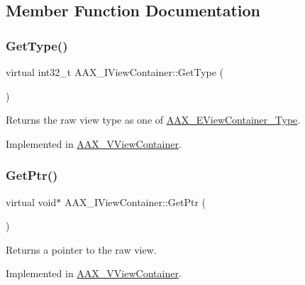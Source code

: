 \subsection{Member Function Documentation}
\mbox{\label{a01889_a1715c042ed8412a2135f4d9e5109e8fb}} 
\subsubsection{\texorpdfstring{GetType()}{GetType()}}
{\footnotesize\ttfamily virtual int32\+\_\+t A\+A\+X\+\_\+\+I\+View\+Container\+::\+Get\+Type (\begin{DoxyParamCaption}{ }\end{DoxyParamCaption})\hspace{0.3cm}{\ttfamily [pure virtual]}}



Returns the raw view type as one of \mbox{\hyperlink{a00503_ab4c36de253fc80b541eb51074c64caef}{A\+A\+X\+\_\+\+E\+View\+Container\+\_\+\+Type}}. 



Implemented in \mbox{\hyperlink{a01945_a2d1b4bc3d5ff813a4761fd0200073be7}{A\+A\+X\+\_\+\+V\+View\+Container}}.

\mbox{\label{a01889_adfde8f90c9a29b83dc80042cf9c3f749}} 
\subsubsection{\texorpdfstring{GetPtr()}{GetPtr()}}
{\footnotesize\ttfamily virtual void$\ast$ A\+A\+X\+\_\+\+I\+View\+Container\+::\+Get\+Ptr (\begin{DoxyParamCaption}{ }\end{DoxyParamCaption})\hspace{0.3cm}{\ttfamily [pure virtual]}}



Returns a pointer to the raw view. 



Implemented in \mbox{\hyperlink{a01945_a8cb4bb50d773b0f37ad38ca8d2bb3ada}{A\+A\+X\+\_\+\+V\+View\+Container}}.

\mbox{\label{a01889_ac2fe16f6d81a8d941e36242d9f9d0980}} 
